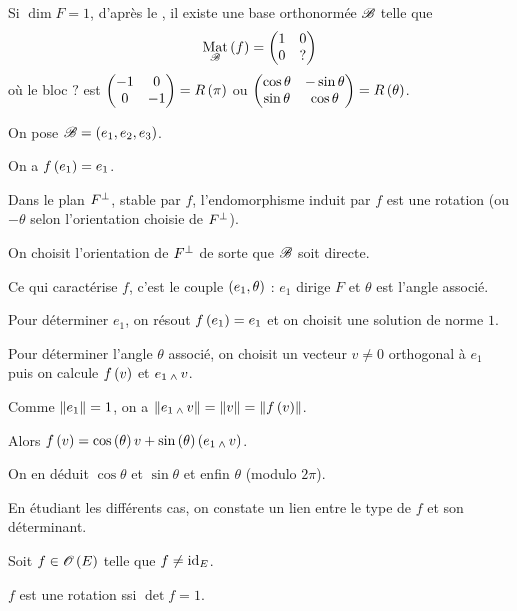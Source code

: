 \begin{dem}
Si \(\dim F=1\), d'après le , il existe une base orthonormée \(\mathscr{B}\) telle que \[\Mat{f}=\begin{pmatrix}
1 & 0 \\
0 & ?
\end{pmatrix}\] où le bloc \(?\) est \(\begin{pmatrix}
-1 & 0 \\
0 & -1
\end{pmatrix}=R\left(\pi\right)\) ou \(\begin{pmatrix}
\cos\theta & -\sin\theta \\
\sin\theta & \cos\theta
\end{pmatrix}=R\left(\theta\right)\).

On pose \(\mathscr{B}=\left(e_1,e_2,e_3\right)\).

On a \(f\left(e_1\right)=e_1\).

Dans le plan \(F^{\perp}\), stable par \(f\), l'endomorphisme induit par \(f\) est une rotation  (ou \(-\theta\) selon l'orientation choisie de \(F^{\perp}\)).

On choisit l'orientation de \(F^{\perp}\) de sorte que \(\mathscr{B}\) soit directe.

Ce qui caractérise \(f\), c'est le couple \(\left(e_1,\theta\right)\) : \(e_1\) dirige \(F\) et \(\theta\) est l'angle associé.

Pour déterminer \(e_1\), on résout \(f\left(e_1\right)=e_1\) et on choisit une solution de norme \(1\).

Pour déterminer l'angle \(\theta\) associé, on choisit un vecteur \(v\not=0\) orthogonal à \(e_1\) puis on calcule \(f\left(v\right)\) et \(e_1\operatorname{_\wedge} v\).

Comme \(\norme{e_1}=1\), on a \(\norme{e_1\vecto v}=\norme{v}=\norme{f\paren{v}}\).

Alors \(f\left(v\right)=\cos\left(\theta\right)v+\sin\left(\theta\right)\left(e_1\operatorname{_\wedge} v\right)\).

On en déduit \(\cos\theta\) et \(\sin\theta\) et enfin \(\theta\) (modulo \(2\pi\)).
\end{dem}

En étudiant les différents cas, on constate un lien entre le type de \(f\) et son déterminant.

\begin{prop}
Soit \(f\in\Orth{}[E]\) telle que \(f\not=\mathrm{id}_{E}\).

\(f\) est une rotation ssi \(\det f=1\).
\end{prop}

